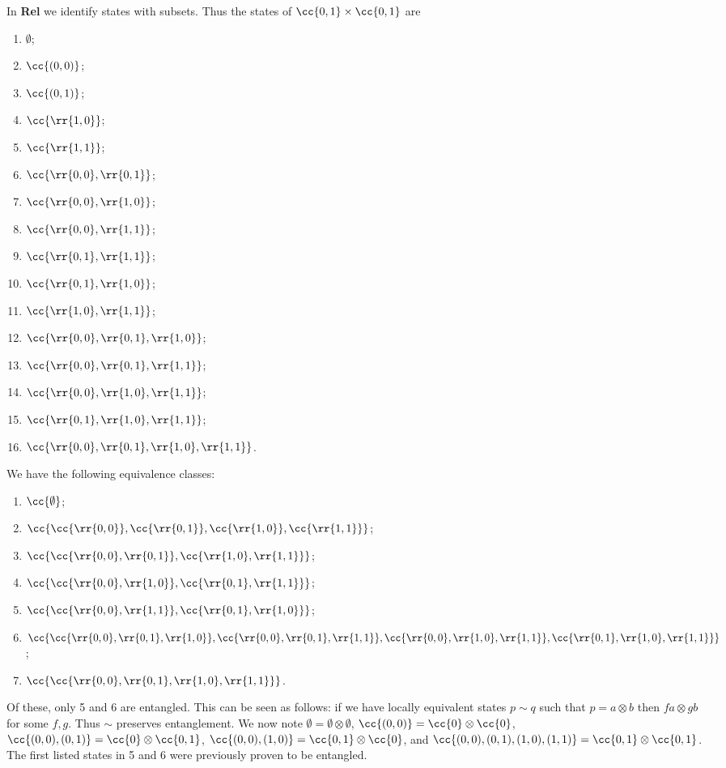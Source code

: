 \documentclass{article}
\begin{document}
\begin{answer*}[c]
  In \textbf{Rel} we identify states with subsets. Thus the states of $\cc{0,1}\times\cc{0,1}$
  are
  \begin{enumerate}
    \item $\emptyset$;
    \item $\cc{(0,0)}$;
    \item $\cc{(0,1)}$;
    \item $\cc{\rr{1,0}}$;
    \item $\cc{\rr{1,1}}$;
    \item $\cc{\rr{0,0},\rr{0,1}}$;
    \item $\cc{\rr{0,0},\rr{1,0}}$;
    \item $\cc{\rr{0,0},\rr{1,1}}$;
    \item $\cc{\rr{0,1},\rr{1,1}}$;
    \item $\cc{\rr{0,1},\rr{1,0}}$;
    \item $\cc{\rr{1,0},\rr{1,1}}$;
    \item $\cc{\rr{0,0},\rr{0,1},\rr{1,0}}$;
    \item $\cc{\rr{0,0},\rr{0,1},\rr{1,1}}$;
    \item $\cc{\rr{0,0},\rr{1,0},\rr{1,1}}$;
    \item $\cc{\rr{0,1},\rr{1,0},\rr{1,1}}$;
    \item $\cc{\rr{0,0},\rr{0,1},\rr{1,0},\rr{1,1}}$.
  \end{enumerate}
\end{answer*}

\begin{answer*}[d]
  We have the following equivalence classes:
  \begin{enumerate}
    \item $\cc{\emptyset}$;
    \item $\cc{\cc{\rr{0,0}},\cc{\rr{0,1}},\cc{\rr{1,0}},\cc{\rr{1,1}}}$;
    \item $\cc{\cc{\rr{0,0},\rr{0,1}},\cc{\rr{1,0},\rr{1,1}}}$;
    \item $\cc{\cc{\rr{0,0},\rr{1,0}},\cc{\rr{0,1},\rr{1,1}}}$;
    \item $\cc{\cc{\rr{0,0},\rr{1,1}},\cc{\rr{0,1},\rr{1,0}}}$;
    \item $\cc{\cc{\rr{0,0},\rr{0,1},\rr{1,0}},
        \cc{\rr{0,0},\rr{0,1},\rr{1,1}},
        \cc{\rr{0,0},\rr{1,0},\rr{1,1}},
      \cc{\rr{0,1},\rr{1,0},\rr{1,1}}}$;
    \item $\cc{\cc{\rr{0,0},\rr{0,1},\rr{1,0},\rr{1,1}}}$.
  \end{enumerate}
  Of these, only 5 and 6 are entangled. This can be seen as follows: if
  we have locally equivalent states $p\sim q$ such that $p=a\otimes b$
  then $fa\otimes gb$ for some $f,g$. Thus $\sim$ preserves entanglement.
  We now note $\emptyset=\emptyset\otimes\emptyset$,
  $\cc{(0,0)}=\cc{0}\otimes\cc{0}$, $\cc{(0,0),(0,1)}=\cc{0}\otimes\cc{0,1}$,
  $\cc{(0,0),(1,0)}=\cc{0,1}\otimes\cc{0}$, and
  $\cc{(0,0),(0,1),(1,0),(1,1)}=\cc{0,1}\otimes\cc{0,1}$.
  The first listed states in 5 and 6 were previously proven to be entangled.
\end{answer*}
\end{document}

